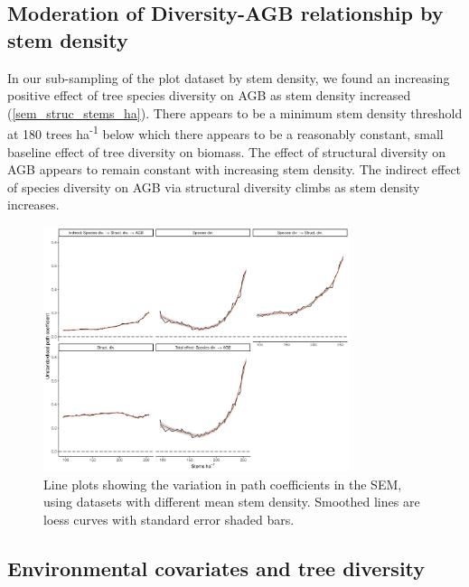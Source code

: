\documentclass[11pt,a4paper]{article}
\newcommand{\textapprox}{\raisebox{0.5ex}{\texttildelow}}  %
\begin{document}


\subsection{Moderation of Diversity-AGB relationship by stem density}

In our sub-sampling of the plot dataset by stem density, we found an increasing positive effect of tree species diversity on AGB as stem density increased (\autoref{sem_struc_stems_ha}). There appears to be a minimum stem density threshold at \textapprox{}180 trees ha\textsuperscript{-1} below which there appears to be a reasonably constant, small baseline effect of tree diversity on biomass. The effect of structural diversity on AGB appears to remain constant with increasing stem density. The indirect effect of species diversity on AGB via structural diversity climbs as stem density increases.

\begin{figure}[H]
\centering
	\includegraphics[width=0.8\textwidth]{sem_struc_stems_ha}
	\caption{Line plots showing the variation in path coefficients in the SEM, using datasets with different mean stem density. Smoothed lines are loess curves with standard error shaded bars.}
	\label{sem_struc_stems_ha}
\end{figure}

\subsection{Environmental covariates and tree diversity}
\end{document}
